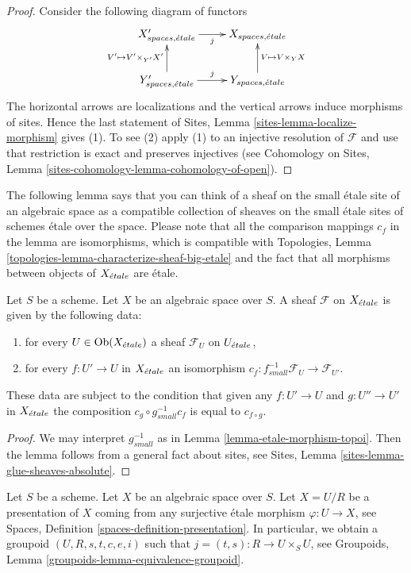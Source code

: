 \begin{proof}
Consider the following diagram of functors
$$
\xymatrix{
X'_{spaces, \etale} \ar[r]_j &
X_{spaces, \etale} \\
Y'_{spaces, \etale} \ar[r]^j \ar[u]^{V' \mapsto V' \times_{Y'} X'} &
Y_{spaces, \etale} \ar[u]_{V \mapsto V \times_Y X}
}
$$
The horizontal arrows are localizations and the vertical arrows induce
morphisms of sites. Hence the last statement of
Sites, Lemma \ref{sites-lemma-localize-morphism}
gives (1). To see (2) apply (1) to an injective resolution of $\mathcal{F}$
and use that restriction is exact and preserves injectives (see
Cohomology on Sites, Lemma \ref{sites-cohomology-lemma-cohomology-of-open}).
\end{proof}

\noindent
The following lemma says that you can think of a sheaf on the small
\'etale site of an algebraic space as a compatible collection of sheaves
on the small \'etale sites of schemes \'etale over the space. Please note
that all the comparison mappings $c_f$ in the lemma are isomorphisms,
which is compatible with
Topologies, Lemma \ref{topologies-lemma-characterize-sheaf-big-etale}
and the fact that all morphisms between objects of $X_{\acute{e}tale}$
are \'etale.

\begin{lemma}
\label{lemma-characterize-sheaf-small-etale}
Let $S$ be a scheme. Let $X$ be an algebraic space over $S$.
A sheaf $\mathcal{F}$ on $X_{\acute{e}tale}$ is given by the following data:
\begin{enumerate}
\item for every $U \in \mathop{\mathrm{Ob}}\nolimits(X_{\acute{e}tale})$ a sheaf
$\mathcal{F}_U$ on $U_{\acute{e}tale}$,
\item for every $f : U' \to U$ in $X_{\acute{e}tale}$ an isomorphism
$c_f : f_{small}^{-1}\mathcal{F}_U \to \mathcal{F}_{U'}$.
\end{enumerate}
These data are subject to the condition that given any $f : U' \to U$
and $g : U'' \to U'$ in $X_{\acute{e}tale}$ the composition
$c_g \circ g_{small}^{-1} c_f$ is equal to $c_{f \circ g}$.
\end{lemma}

\begin{proof}
We may interpret $g_{small}^{-1}$ as in Lemma \ref{lemma-etale-morphism-topoi}.
Then the lemma follows from a general fact about sites, see
Sites, Lemma \ref{sites-lemma-glue-sheaves-absolute}.
\end{proof}

\noindent
Let $S$ be a scheme. Let $X$ be an algebraic space over $S$.
Let $X = U/R$ be a presentation of $X$ coming from any surjective
\'etale morphism $\varphi : U \to X$, see
Spaces, Definition \ref{spaces-definition-presentation}.
In particular, we obtain a groupoid $(U, R, s, t, c, e, i)$ such that
$j = (t, s) : R \to U \times_S U$, see
Groupoids, Lemma \ref{groupoids-lemma-equivalence-groupoid}.

